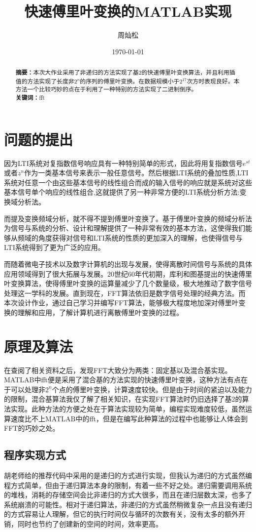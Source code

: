 \documentclass{../source/zju}
\title{\zihao{4} \bf{快速傅里叶变换的MATLAB实现}}
\author{\zihao{5}周灿松}
\date{}
\date{\today}
\begin{document}
\makecover
\maketitle
\begin{abstract}
    \noindent
    {\bf 摘要：}本次大作业采用了非递归的方法实现了基2的快速傅里叶变换算法，并且利用插值的方法实现了长度非$2^n$的序列的傅里叶变换。在数据规模小于$2^{17}$次方时表现良好。本方法一个比较巧妙的点在于利用了一种特别的方法实现了二进制倒序。\\
    {\bf 关键词：}fft
\end{abstract}

\section{问题的提出}
因为LTI系统对复指数信号响应具有一种特别简单的形式，因此将用复指数信号$e^{st}$或者$z^n$作为一类基本信号来表示一般任意信号。然后根据LTI系统的叠加性质,LTI系统对任意一个由这些基本信号的线性组合而成的输入信号的响应就是系统对这些基本信号单个响应的线性组合,这就提供了另一种非常方便的LTI系统分析方法:变换域分析法。

而提及变换频域分析，就不得不提到傅里叶变换了。基于傅里叶变换的频域分析法为信号与系统的分析、设计和理解提供了一种非常有效的基本方法，这使得我们能够从频域的角度获得对信号和LTI系统的性质的更加深入的理解，也使得信号与LTI系统得到了更为广泛的应用。

而随着微电子技术以及数字计算机的出现与发展，使得离散时间信号与系统的具体应用领域得到了很大拓展与发展。20世纪60年代初期，库利和图基提出的快速傅里叶变换算法，使得傅里叶变换的运算量减少了几个数量级，极大地推动了数字信号处理这一学科的发展。直到现在，FFT算法依旧是数字信号处理的经典方法。而本次设计作业，通过自己学习并编写FFT算法，能够极大程度地加深对傅里叶变换的理解和应用，了解计算机进行离散傅里叶变换的过程。

\section{原理及算法}
在查阅了相关资料之后，发现FFT大致分为两类：固定基以及混合基实现。MATLAB中fft便是采用了混合基的方法实现的快速傅里叶变换，这种方法有点在于可以处理非$2^n$个点的傅里叶变换，计算速度较快。但是由于时间的紧迫以及能力的限制，混合基算法我仅了解了相关知识，在实现FFT算法时仍旧选择了基2的算法实现。此种方法的方便之处在于算法实现较为简单，编程实现难度较低，虽然运算速度比不上MATLAB中的fft，但是在编写此种算法的过程中也能够让人体会到FFT的巧妙之处。
\subsection{程序实现方式}
胡老师给的推荐代码中采用的是递归的方式进行实现，但我认为递归的方式虽然编程方式简单，但由于递归算法本身的限制，有着一些不好之处。递归需要调用系统的堆栈，消耗的存储空间会比非递归的方式大很多，而且在递归层数太深，也多了系统崩溃的可能性。相对于递归算法，非递归的方式虽然稍微复杂一点且没有递归的方式容易让人理解，但它的执行时间仅与循环的次数有关，没有太多的额外开销，同时也节约了创建新的空间的时间，效率更高。
\end{document}

